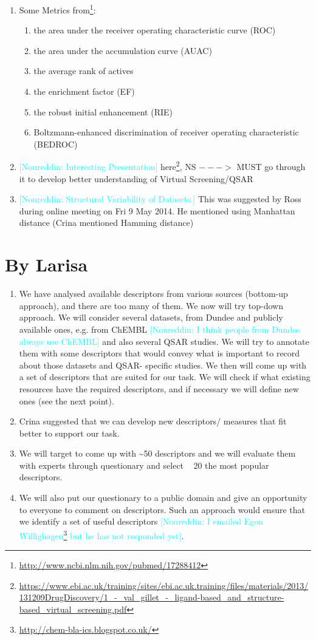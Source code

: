 \documentclass[a4paper,12pt, english]{article}
\newcommand{\kibitz}[2]{\ifnum\Comments=1\textcolor{#1}{#2}\fi}
\newcommand{\ns}[1]{\kibitz{cyan}     {[Noureddin: #1]}}
\begin{document}
\begin{enumerate}
	\item Some Metrics from\footnote{\url{http://www.ncbi.nlm.nih.gov/pubmed/17288412}}:
	\begin{enumerate}
	\item the area under the receiver operating characteristic curve (ROC)
	\item the area under the accumulation curve (AUAC)
	\item the average rank of actives
	\item the enrichment factor (EF)
	\item the robust initial enhancement (RIE)
	\item Boltzmann-enhanced discrimination of receiver operating characteristic (BEDROC)
	\end{enumerate}
	\item \ns{Interesting Presentation} here\footnote{\url{https://www.ebi.ac.uk/training/sites/ebi.ac.uk.training/files/materials/2013/131209DrugDiscovery/1_-_val_gillet_-_ligand-based_and_structure-based_virtual_screening.pdf}}, NS $--->$ MUST go through it to develop better understanding of Virtual Screening/QSAR
	
	\item \ns{Structural Variability of Datasets.} This was suggested by Ross during online meeting on Fri 9 May 2014. He mentioned using Manhattan distance (Crina mentioned Hamming distance)
\end{enumerate}    

\section{By Larisa}
\begin{enumerate}
	\item We have analysed available descriptors from various sources (bottom-up approach), and there are too many of them. We now will try top-down approach. We will consider several datasets, from Dundee and publicly available ones, e.g. from ChEMBL \ns{I think people from Dundee always use ChEMBL} and also several QSAR studies. We will try to annotate them with some descriptors that would convey what is important to record about those datasets and QSAR- specific studies. We then will come up with a set of descriptors that are suited for our task. We will check if what existing resources have the required descriptors, and if necessary we will define new ones (see the next point).
	\item Crina suggested that we can develop new descriptors/ measures that fit better to support our task.
	\item We will target to come up with \textasciitilde50 descriptors and we will evaluate them with experts through questionary and select  ~ 20 the most popular descriptors.
	\item We will also put our questionary to a public domain and give an opportunity to everyone to comment on descriptors. Such an approach would ensure that we identify a set of useful descriptors \ns{I emailed Egon Willighagen\footnote{\url{http://chem-bla-ics.blogspot.co.uk/}} but he has not responded yet}.
\end{enumerate}  
\end{document}
